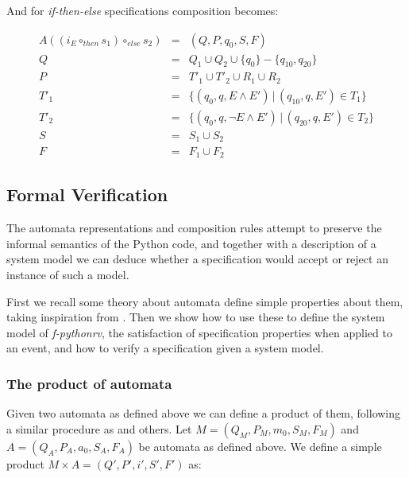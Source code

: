 And for \textit{if-then-else} specifications composition becomes:

\medskip
\[
  \begin{array}{rcl}
  A((i_E \circ_{then} s_1) \circ_{else} s_2) & = & (Q, P, q_0, S, F) \\
                                           Q & = & Q_1 \cup Q_2 \cup \{q_0\} - \{q_{10}, q_{20}\} \\
                                           P & = & T'_1 \cup T'_2 \cup R_1 \cup R_2 \\
                                        T'_1 & = & \{(q_0, q, E       \wedge E') \, | \, (q_{10}, q, E') \in T_1\} \\
                                        T'_2 & = & \{(q_0, q, \neg E \wedge E') \, | \, (q_{20}, q, E') \in T_2\} \\
                                           S & = & S_1 \cup S_2 \\
                                           F & = & F_1 \cup F_2
  \end{array}
\]
\medskip





\subsection{Formal Verification} \label{section-approach-formal-foundation-semantics}

The automata representations and composition rules attempt to preserve the
informal semantics of the Python code, and together with a description of a
system model we can deduce whether a specification would accept or reject an
instance of such a model.

First we recall some theory about automata define simple properties about them,
taking inspiration from \cite{chaki04lks, schneider04kripke}. Then we show how
to use these to define the system model of \textit{f-pythonrv}, the
satisfaction of specification properties when applied to an event, and how to
verify a specification given a system model.


\subsubsection{The product of automata}

Given two automata as defined above we can define a product of them, following
a similar procedure as \cite{chaki04lks, schneider04kripke} and others. Let $M
= (Q_M,P_M,m_0,S_M,F_M)$ and $A = (Q_A,P_A,a_0,S_A,F_A)$ be automata as defined
above. We define a simple product $M \times A = (Q',P',i',S',F')$ as:

